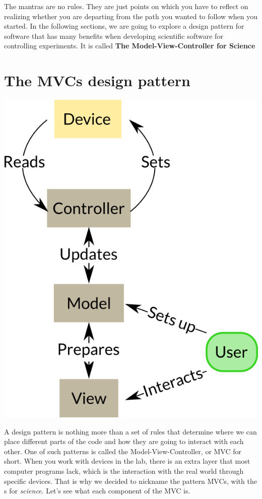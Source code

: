 The mantras are no rules. They are just points on which you have to reflect on realizing whether you are departing from the path you wanted to follow when you started. In the following sections, we are going to explore a design pattern for software that has many benefits when developing scientific software for controlling experiments. It is called \textbf{The Model-View-Controller for Science}

\section{The MVCs design pattern}\label{sec:mvc}
\begin{center}
\includegraphics{images/Chapter_04/MVCs.png}
\end{center}

A design pattern is nothing more than a set of rules that determine where we can place different parts of the code and how they are going to interact with each other. One of such patterns is called the Model-View-Controller, or MVC for short. When you work with devices in the lab, there is an extra layer that most computer programs lack, which is the interaction with the real world through specific devices. That is why we decided to nickname the pattern MVCs, with the s for \emph{science}. Let's see what each component of the MVC is.

